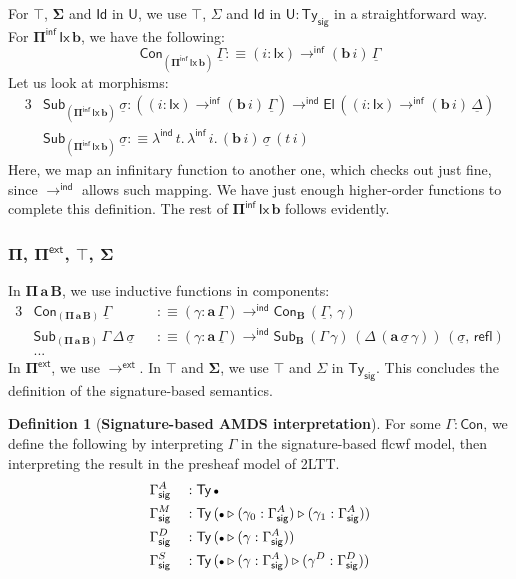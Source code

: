 \documentclass[12pt,a4paper,twoside,openany]{book}
\theoremstyle{remark}
\theoremstyle{definition}
\newtheorem{mydefinition}{Definition}
\theoremstyle{theorem}
\newcommand{\ms}[1]{\mathsf{#1}}
\newcommand{\bs}[1]{\boldsymbol{#1}}
\newcommand{\toind}{\to^{\ms{ind}}}
\newcommand{\Tys}{\ms{Ty_{sig}}}
\newcommand{\refl}{\mathsf{refl}}
\newcommand{\Con}{\mathsf{Con}}
\newcommand{\Sub}{\mathsf{Sub}}
\newcommand{\Ty}{\mathsf{Ty}}
\newcommand{\U}{\mathsf{U}}
\newcommand{\El}{\mathsf{El}}
\newcommand{\Id}{\mathsf{Id}}
\newcommand{\ext}{\triangleright}
\newcommand{\emptycon}{\scaleobj{.75}\bullet}
\newcommand{\Pie}{\Pi^{\mathsf{ext}}}
\newcommand{\toe}{\to^{\ms{ext}}}
\newcommand{\Piinf}{\Pi^{\mathsf{inf}}}
\newcommand{\toinf}{\to^{\ms{inf}}}
\newcommand{\lambdainf}{\lambda^{\ms{inf}}}
\newcommand{\ba}{\bs{a}}
\newcommand{\bb}{\bs{b}}
\newcommand{\bB}{\bs{B}}
\newcommand{\bU}{\bs{\U}}
\newcommand{\bPiinf}{\bs{\Piinf}}
\newcommand{\bId}{\bs{\Id}}
\newcommand{\ul}[1]{\underline{#1}}
\newcommand{\ulGamma}{\ul{\Gamma}}
\newcommand{\ulDelta}{\ul{\Delta}}
\newcommand{\ulsigma}{\ul{\sigma}}
\newcommand{\defn}{:\equiv}
\begin{document}
For $\bs{\top}$, $\bs{\Sigma}$ and $\bId$ in $\bU$, we use $\top$, $\Sigma$ and
$\Id$ in $\U : \Tys$ in a straightforward way. For $\bPiinf\,\ms{Ix}\,\bb$, we
have the following:
\[
   \Con_{(\bPiinf\,\ms{Ix}\,\bb)}\,\ulGamma \defn (i : \ms{Ix}) \toinf (\bb\,i)\,\ulGamma
\]
Let us look at morphisms:
\begin{alignat*}{3}
  &\Sub_{(\bPiinf\,\ms{Ix}\,\bb)}\,\ulsigma : ((i : \ms{Ix}) \toinf (\bb\,i)\,\ulGamma)
    \toind \El\,((i : \ms{Ix}) \toinf (\bb\,i)\,\ulDelta)\\
  &\Sub_{(\bPiinf\,\ms{Ix}\,\bb)}\,\ulsigma \defn \lambda^{\ms{ind}}\,t.\,\lambdainf\,i.\,
    (\bb\,i)\,\ulsigma\,(t\,i)
\end{alignat*}
Here, we map an infinitary function to another one, which checks out just fine,
since $\toind$ allows such mapping. We have just enough higher-order functions
to complete this definition. The rest of $\bPiinf\,\ms{Ix}\,\bb$ follows evidently.

\subsubsection{$\bs{\Pi}$, $\bs{\Pie}$, $\bs{\top}$, $\bs{\Sigma}$}

In $\bs{\Pi\,a\,B}$, we use inductive functions in components:
\begin{alignat*}{3}
  &\Con_{(\bs{\Pi\,a\,B})}\,\ulGamma &&\defn (\gamma : \ba\,\ulGamma) \toind \Con_{\bB}\,(\ulGamma,\,\gamma)\\
  &\Sub_{(\bs{\Pi\,a\,B})}\,\Gamma\,\Delta\,\ulsigma &&\defn (\gamma : \ba\,\ulGamma) \toind \Sub_{\bB}\,(\Gamma\,\gamma)\,(\Delta\,(\ba\,\ulsigma\,\gamma))\,(\ulsigma,\,\refl)\\
  & ... &&
\end{alignat*}
In $\bs{\Pie}$, we use $\toe$. In $\bs{\top}$ and $\bs{\Sigma}$, we use $\top$ and $\Sigma$ in $\Tys$. This concludes the definition of the signature-based semantics.

\begin{mydefinition}[\textbf{Signature-based AMDS interpretation}]
For some $\Gamma : \Con$, we define the following by interpreting $\Gamma$ in
the signature-based flcwf model, then interpreting the result in the presheaf
model of 2LTT.
\begin{alignat*}{3}
  &\Gamma^A_{\ms{sig}} &&: \Ty\,\emptycon \\
  &\Gamma^M_{\ms{sig}} &&: \Ty\,(\emptycon\ext(\gamma_0 : \Gamma^A_{\ms{sig}})\ext(\gamma_1 : \Gamma^A_{\ms{sig}}))\\
  &\Gamma^D_{\ms{sig}} &&: \Ty\,(\emptycon\ext(\gamma : \Gamma^A_{\ms{sig}}))\\
  &\Gamma^S_{\ms{sig}} &&: \Ty\,(\emptycon\ext(\gamma : \Gamma^A_{\ms{sig}})\ext(\gamma^D : \Gamma^D_{\ms{sig}}))
\end{alignat*}
\end{mydefinition}
\end{document}
